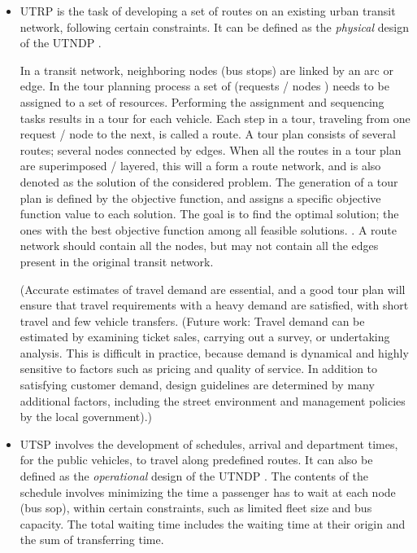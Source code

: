 \begin{itemize}
\item UTRP is the task of developing a set of routes on an existing urban transit network, following certain constraints. It can be defined as the \textit{physical} design of the UTNDP \citep{fan09}. 
 
In a transit network, neighboring nodes (bus stops) are linked by an arc or edge. In the tour planning process a set of (requests / nodes ) needs to be assigned to a set of resources. Performing the assignment and sequencing tasks results in a tour for each vehicle. Each step in a tour, traveling from one request / node to the next, is called a route. A tour plan consists of several routes; several nodes connected by edges. When all the routes in a tour plan are superimposed / layered, this will a form a route network, and is also denoted as the solution of the considered problem. The generation of a tour plan is defined by the objective function, and assigns a specific objective function value to each solution. The goal is to find the optimal solution; the ones with the best objective function among all feasible solutions. \citep{vehiclerouting}. A route network should contain all the nodes, but may not contain all the edges present in the original transit network.

(Accurate estimates of travel demand are essential, and a good tour plan will ensure that travel requirements with a heavy demand are satisfied, with short travel and few vehicle transfers. (Future work: Travel demand can be estimated by examining ticket sales, carrying out a survey, or undertaking analysis. This is difficult in practice, because demand is dynamical and highly sensitive to factors such as pricing and quality of service. In addition to satisfying customer demand, design guidelines are determined by many additional factors, including the street environment and management policies by the local government).)

\item UTSP involves the development of schedules, arrival and department times, for the public vehicles, to travel along predefined routes. It can also be defined as the \textit{operational} design of the UTNDP \citep{fan09}. 
The contents of the schedule involves minimizing the time a passenger has to wait at each node (bus sop), within certain constraints, such as limited fleet size and bus capacity.  The total waiting time includes the waiting time at their origin and the sum of transferring time. 

\end{itemize}

